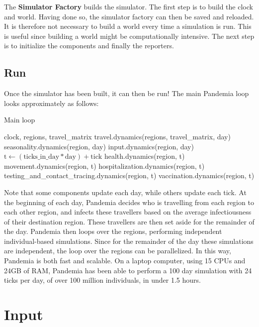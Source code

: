 \documentclass[10pt,letterpaper]{article}
\begin{document}
The \textbf{Simulator Factory} builds the simulator. The first step is to build the clock and world. Having done so, the simulator factory can then be saved and reloaded. It is therefore not necessary to build a world every time a simulation is run. This is useful since building a world might be computationally intensive. The next step is to initialize the components and finally the reporters.

\subsection{Run}

Once the simulator has been built, it can then be run! The main Pandemia loop looks approximately as follows:

\begin{algorithm}
\caption{Main loop}\label{alg:mainloop}
\begin{algorithmic}
\Require clock, regions, travel{\_}matrix
\State travel.dynamics(regions, travel{\_}matrix, day)
\State seasonality.dynamics(region, day)
\State input.dynamics(region, day)
\State $\text{t} \gets (\text{ticks{\_}in{\_}day} * \text{day}) + \text{tick}$
\State health.dynamics(region, t)
\State movement.dynamics(region, t)
\State hospitalization.dynamics(region, t)
\EndFor
\State testing{\_}and{\_}contact{\_}tracing.dynamics(region, t)
\State vaccination.dynamics(region, t)
\EndFor
\EndFor
\end{algorithmic}
\end{algorithm}

Note that some components update each day, while others update each tick. At the beginning of each day, Pandemia decides who is travelling from each region to each other region, and infects these travellers based on the average infectiousness of their destination region. These travellers are then set aside for the remainder of the day. Pandemia then loops over the regions, performing independent individual-based simulations. Since for the remainder of the day these simulations are independent, the loop over the regions can be parallelized. In this way, Pandemia is both fast and scalable. On a laptop computer, using 15 CPUs and 24GB of RAM, Pandemia has been able to perform a 100 day simulation with 24 ticks per day, of over 100 million individuals, in under 1.5 hours.

\section{Input}
\end{document}
